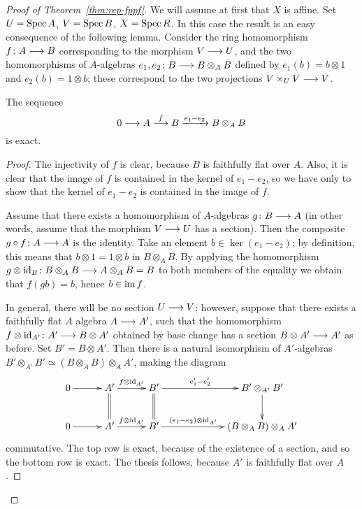 \begin{2   CONTRAVARIANT FUNCTORS}
\begin{2.3 Sheaves in Grothendieck topologies}
\begin{proof}[Proof of Theorem~\ref{thm:rep-fppf}]
We will assume at first that $X$ is affine. Set $U = \operatorname{Spec} A$, $V = \operatorname{Spec} B$, $X = \operatorname{Spec} R$. In this case the result is an easy consequence of the following lemma. Consider the ring homomorphism $f \colon A \arr B$ corresponding to the morphism $V \arr U$, and the two homomorphisms of $A$-algebras $e_1, e_2\colon B \arr B \otimes_A B$ defined by $e_1(b) = b \otimes 1$ and $e_2(b) = 1 \otimes b$; these correspond to the two projections $V \times_U V \arr V$.

\begin{lemma}\label{lem:exact-affine}
The sequence
   \[
   0 \arr A \overset{f}\larr B
   \xrightarrow{e_1 - e_2} B \otimes_A B
   \]
is exact.
\end{lemma}
\begin{proof}

The injectivity of $f$ is clear, because $B$ is faithfully flat over $A$. Also, it is clear that the image of $f$ is contained in the kernel of $e_1 - e_2$, so we have only to show that the kernel of $e_1 - e_2$ is contained in the image of $f$.

Assume that there exists a homomorphism of $A$-algebras $g \colon B \arr A$ (in other words, assume that the morphism $V \arr U$ has a section). Then the composite $g \circ f \colon A\arr A$ is the identity. Take an element $b \in \ker (e_1 - e_2)$; by definition, this means that $b \otimes 1 = 1 \otimes b$ in $B \otimes_A B$. By applying the homomorphism $g \otimes \id_B \colon B \otimes_A B \arr A \otimes_A B = B$ to both members of the equality we obtain that $f(g b) = b$, hence $b \in \operatorname{im} f$.

In general, there will be no section $U \arr V$; however, suppose that there exists a faithfully flat $A$ algebra $A \arr A'$, such that the homomorphism $f \otimes \id_{A'} \colon A' \arr B \otimes A'$ obtained by base change has a section $B \otimes A' \arr A'$ as before. Set $B' = B \otimes A'$. Then there is a natural isomorphism of $A'$-algebras $B' \otimes_{A'} B' \simeq (B \otimes_A B) \otimes_A A'$, making the diagram
   \[
   \xymatrix@C+5pt{
   0\ar[r] & A'\ar[r]^-{f \otimes \id_{A'}}\ar@{=}[d]
   &B'\ar@{=}[d]\ar[rr]^-{e'_1 - e'_2}
   && B' \otimes_{A'} B'\ar[d]\\
   0\ar[r] & A'\ar[r]^-{f \otimes \id_{A'}}
   &B'\ar[rr]^-{(e_1 - e_2) \otimes \id_{A'}}
   && (B \otimes_A B) \otimes_A A'
   }
   \]
commutative. The top row is exact, because of the existence of a section, and so the bottom row is exact. The thesis follows, because $A'$ is faithfully flat over $A$.


\end{proof}
\end{proof}
\end{2.3 Sheaves in Grothendieck topologies}
\end{2   CONTRAVARIANT FUNCTORS}
